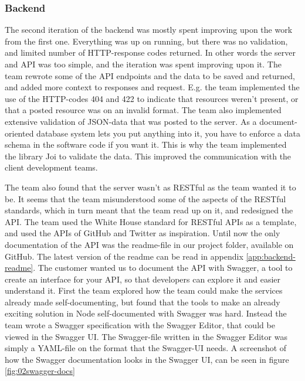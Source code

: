 \subsubsection{Backend}
The second iteration of the \gls{backend} was mostly spent improving upon the work from the first one. Everything was up on running, but there was no validation, and limited number of HTTP-response codes returned. In other words the server and \gls{API} was too simple, and the iteration was spent improving upon it. The team rewrote some of the \gls{API} endpoints and the data to be saved and returned, and added more context to responses and request. E.g. the team implemented the use of the HTTP-codes 404 and 422 to indicate that resources weren't present, or that a posted resource was on an invalid format. The team also implemented extensive validation of \gls{JSON}-data that was posted to the server. As a document-oriented database system lets you put anything into it, you have to enforce a data schema in the software code if you want it. This is why the team implemented the library Joi to validate the data. \cite{node-joi-module} This improved the communication with the client development teams.

The team also found that the server wasn't as RESTful as the team wanted it to be. It seems that the team misunderstood some of the aspects of the RESTful standards, which in turn meant that the team read up on it, and redesigned the API. \cite{w3c-rest} The team used the White House standard for RESTful APIs as a template, and used the APIs of GitHub and Twitter as inspiration. \cite{whitehouse-api-standard}\cite{github-api}\cite{twitter-api} Until now the only documentation of the \gls{API} was the readme-file in our project folder, available on GitHub. The latest version of the readme can be read in appendix \ref{app:backend-readme}. The customer wanted us to document the \gls{API} with Swagger, a tool to create an interface for your API, so that developers can explore it and easier understand it. \cite{swagger} First the team explored how the team could make the services already made self-documenting, but found that the tools to make an already exciting solution in Node self-documented with Swagger was hard. Instead the team wrote a Swagger specification with the Swagger Editor, that could be viewed in the Swagger UI. \cite{swagger-editor}\cite{swagger-ui} The Swagger-file written in the Swagger Editor was simply a \gls{YAML}-file on the format that the Swagger-UI needs. A screenshot of how the Swagger documentation looks in the Swagger UI, can be seen in figure \ref{fig:02swagger-docs}

